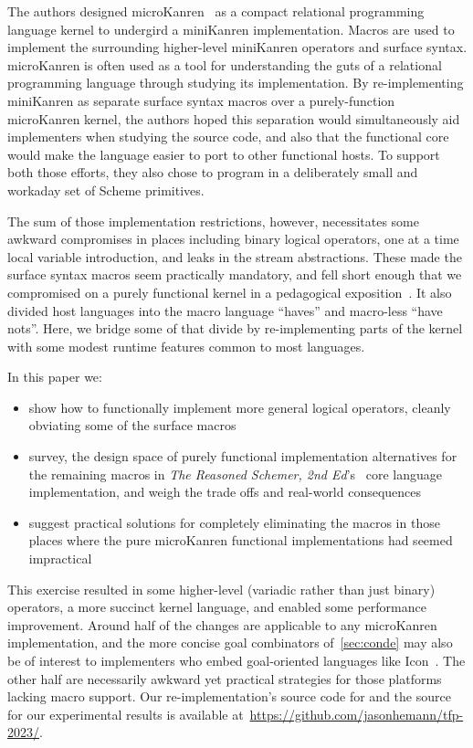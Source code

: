 \documentclass[sigplan,balance,pbalance,natbib=false]{acmart}
\begin{document}
The authors designed microKanren~\cite{hemann2013muKanren} as a
compact relational programming language kernel to undergird a
miniKanren implementation. Macros are used to implement the
surrounding higher-level miniKanren operators and surface syntax.\@
microKanren is often used as a tool for understanding the guts of a
relational programming language through studying its implementation.
By re-implementing miniKanren as separate surface syntax macros over a
purely-function microKanren kernel, the authors hoped this separation
would simultaneously aid implementers when studying the source code,
and also that the functional core would make the language easier to
port to other functional hosts. To support both those efforts, they
also chose to program in a deliberately small and workaday set of
Scheme primitives.

The sum of those implementation restrictions, however, necessitates
some awkward compromises in places including binary logical operators,
one at a time local variable introduction, and leaks in the stream
abstractions. These made the surface syntax macros seem practically
mandatory, and fell short enough that we compromised on a purely
functional kernel in a pedagogical
exposition~\cite{friedman2018reasoned}. It also divided host languages
into the macro language \enquote{haves} and macro-less \enquote{have
  nots}. Here, we bridge some of that divide by re-implementing parts
of the kernel with some modest runtime features common to most
languages.

In this paper we:
%
\begin{itemize}

\item show how to functionally implement more general logical
  operators, cleanly obviating some of the surface macros

\item survey, the design space of purely functional implementation
  alternatives for the remaining macros in \emph{The Reasoned Schemer,
    2nd Ed}'s~\cite{friedman2018reasoned} core language
  implementation, and weigh the trade offs and real-world consequences

\item suggest practical solutions for completely eliminating the
  macros in those places where the pure microKanren functional
  implementations had seemed impractical

\end{itemize}

This exercise resulted in some higher-level (variadic rather than just
binary) operators, a more succinct kernel language, and enabled some
performance improvement. Around half of the changes are applicable to
any microKanren implementation, and the more concise goal combinators
of~\cref{sec:conde} may also be of interest to implementers who embed
goal-oriented languages like Icon~\cite{griswold1983icon}. The other
half are necessarily awkward yet practical strategies for those
platforms lacking macro support. Our re-implementation's source code
for and the source for our experimental results is available
at~\url{https://github.com/jasonhemann/tfp-2023/}.
\end{document}
